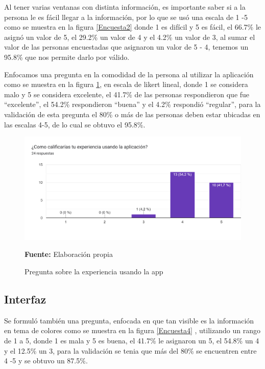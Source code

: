 \documentclass[12pt,twocolumn,a4paper]{article}
\begin{document}
Al tener varias ventanas con distinta información, es importante saber si a la persona le es fácil llegar a la información, por lo que se usó una escala de 1 -5 como se muestra en la figura \ref{Encuesta2}  donde 1 es difícil y 5 es fácil, el 66.7\% le asignó un valor de 5, el 29.2\% un valor de 4 y el 4.2\% un valor de 3, al sumar el valor de las personas encuestadas que asignaron un valor de 5 - 4, tenemos un 95.8\% que nos permite darlo por válido. 


Enfocamos una pregunta en la comodidad de la persona al utilizar la aplicación como se muestra en la figura \ref{Encuesta3},  en escala de likert lineal, donde 1 se considera malo y 5 se considera excelente, el 41.7\% de las personas respondieron que fue “excelente”, el 54.2\% respondieron “buena” y el 4.2\% respondió “regular”,  para la validación de esta pregunta el 80\% o más de las personas deben estar ubicadas en las escalas 4-5, de lo cual se obtuvo el 95.8\%.

\begin{figure}
	\centering
	\includegraphics[scale=0.2]{Encuesta3.png}
	\caption{Pregunta sobre la experiencia usando la app} \textbf{Fuente:} Elaboración propia 
	\label{Encuesta3}
\end{figure}

\subsection{Interfaz}

Se formuló también una pregunta, enfocada en que tan visible es la información en tema de colores como se muestra en la figura \ref{Encuesta4} , utilizando un rango de 1 a 5, donde 1 es mala y 5 es buena, el 41.7\% le asignaron un 5, el 54.8\% un 4 y el 12.5\% un 3, para la validación se tenia que más del 80\% se encuentren entre 4 -5 y se obtuvo un 87.5\%.
\end{document}
